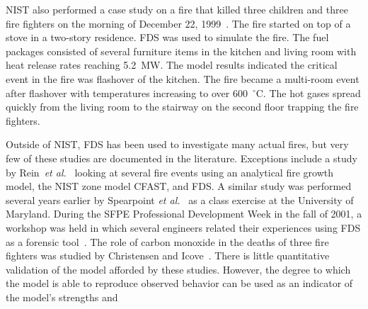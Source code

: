 NIST also performed a case study on a fire that killed three children and three fire fighters on the morning of December 22, 1999~\cite{Iowa}. The
fire started on top of a stove in a two-story residence. FDS was used to simulate the fire.  The fuel packages consisted of several furniture items
in the kitchen and living room with heat release rates reaching 5.2~MW. The model results indicated the critical event in the fire was flashover of
the kitchen. The fire became a multi-room event after flashover with temperatures increasing to over 600~$^\circ$C. The hot gases spread quickly from
the living room to the stairway on the second floor trapping the fire fighters.

Outside of NIST, FDS has been used to investigate many actual fires, but very few of these studies are documented in the literature. Exceptions
include a study by Rein~{\em et al.}~\cite{Rein:Interflam2004} looking at several fire events using an analytical fire growth model, the NIST zone
model CFAST, and FDS. A similar study was performed several years earlier by Spearpoint {\em et al.}~\cite{Spearpoint:ICFRE3} as a class exercise at
the University of Maryland. During the SFPE Professional Development Week in the fall of 2001, a workshop was held in which several engineers related
their experiences using FDS as a forensic tool~\cite{Carpenter:SFPE2001}. The role of carbon monoxide in the deaths of three fire fighters was
studied by Christensen and Icove~\cite{Christensen:JFS}. There is little quantitative validation of the model afforded by these studies. However, the
degree to which the model is able to reproduce observed behavior can be used as an indicator of the model's strengths and
